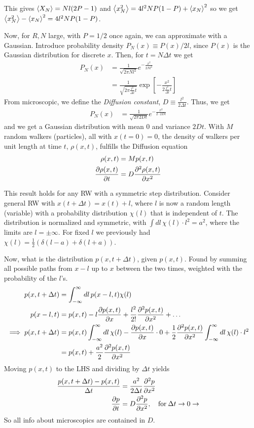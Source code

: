 \documentclass[a4paper, english, 12pt]{article}
\begin{document}
\begin{multicols*}{2}
This gives $\expval{X_N}=Nl(2P-1)$ and $\expval{x_N^2}=4l^2 NP(1-P) + \expval{x_N}^2$ so we get $\expval{x_N^2} - \expval{x_N}^2 = 4l^2 N P(1-P)$.

Now, for $R,N$ large, with $P=1/2$ once again, we can approximate with a Gaussian. Introduce probability density $P_N(x)\equiv P(x)/2l$, since $P(x)$ is the Gaussian distribution for discrete $x$. Then, for $t=N\Delta t$ we get 
\begin{align*}
    P_N(x) &= \frac{1}{\sqrt{2\pi Nl^2}} e^{-\frac{x^2}{2Nl^2}} \\ 
    &= \frac{1}{\sqrt{2\pi \frac{l^2}{\Delta t} t}} \exp[-\frac{x^2}{2\frac{l^2}{\Delta t} t}]
\end{align*}  
From microscopic, we define the \textit{Diffusion constant}, $D\equiv \frac{l^2}{2\Delta t}$. Thus, we get 
\begin{align*}
    P_N(x) &= \frac{1}{\sqrt{2\pi 2Dt}} e^{-\frac{x^2}{2\cdot 2Dt}}
\end{align*}
and we get a Gaussian distribution with mean $0$ and variance $2Dt$. With $M$ random walkers (particles), all with $x(t=0)=0$, the density of walkers per unit length at time $t$, $\rho(x,t)$, fulfills the Diffusion equation 
\begin{align*}
    \rho(x,t) &= M p(x,t) \\ 
    \pdv{\rho(x,t)}{t} &= D \pdv[2]{\rho(x,t)}{x}
\end{align*}


This result holds for any RW with a symmetric step distribution. Consider general RW with $x(t+\Delta t)=x(t)+l$, where $l$ is now a random length (variable) with a probability distribution $\chi(l)$ that is independent of $t$. The distribution is normalized and symmetric, with $\int dl\,\chi(l)\cdot l^2=a^2$, where the limits are $l=\pm\infty$. For fixed $l$ we previously had $\chi(l)=\frac{1}{2}(\delta(l-a) + \delta(l+a))$. 

Now, what is the distribution $p(x,t+\Delta t)$, given $p(x,t)$. Found by summing all possible paths from $x-l$ up to $x$ between the two times, weighted with the probability of the $l$'s. 
\begin{align*}
    p(x,t+\Delta t) &= \int_{-\infty}^\infty dl\, p(x-l,t)\chi(l) \\ 
    p(x-l,t) &= p(x,t) - l \pdv{p(x,t)}{x} + \frac{l^2}{2!}\pdv[2]{p(x,t)}{x} + \dots \\ 
    \implies p(x,t+\Delta t) &= p(x,t)\int_{-\infty}^\infty dl\,\chi(l) - \pdv{p(x,t)}{x} \cdot 0 + \frac{1}{2} \pdv[2]{p(x,t)}{x} \int_{-\infty}^\infty dl\,\chi(l)\cdot l^2 \\ 
    &= p(x,t) + \frac{a^2}{2} \pdv[2]{p(x,t)}{x}
\end{align*}
Moving $p(x,t)$ to the LHS and dividing by $\Delta t$ yields 
\begin{align*}
    \frac{p(x,t+\Delta t) - p(x,t)}{\Delta t} &= \frac{a^2}{2\Delta t} \pdv[2]{p}{x} \\ 
    \pdv{p}{t} &= D \pdv[2]{p}{x},\quad \text{for}\: \Delta t \to 0 \to
\end{align*}
So all info about microscopics are contained in $D$. 




\end{multicols*}
\end{document}
